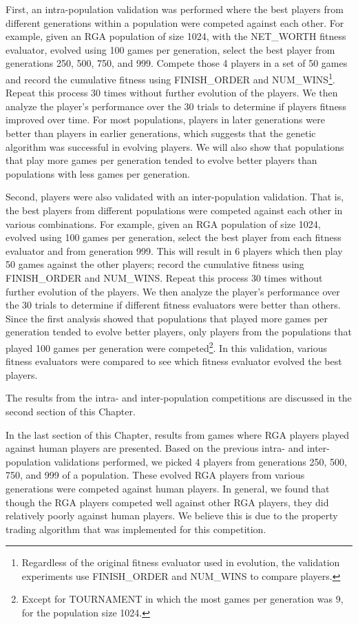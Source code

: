 First, an intra-population validation was performed where the best players from
different generations within a population were competed against each other.
For example, given an RGA population of size 1024, with the NET\_WORTH fitness
evaluator, evolved using 100 games per generation, select the best player from
generations 250, 500, 750, and 999. Compete those 4 players in a set of 50 games
and record the cumulative fitness using FINISH\_ORDER and
NUM\_WINS\footnote{Regardless of the original fitness evaluator used in
evolution, the validation experiments use FINISH\_ORDER and NUM\_WINS to
compare players.}. Repeat this process 30 times without further evolution of the
players. We then analyze the player's performance over the 30 trials to
determine if players fitness improved over time. For most populations, players
in later generations were better than players in earlier generations, which
suggests that the genetic algorithm was successful in evolving players. We will
also show that populations that play more games per generation tended to evolve
better players than populations with less games per generation. 

Second, players were also validated with an inter-population validation. That
is, the best players from different populations were competed against each other
in various combinations. For example, given an RGA population of size 1024,
evolved using 100 games per generation, select the best player from each fitness
evaluator and from generation 999. This will result in 6 players which then play
50 games against the other players;  record the cumulative fitness using
FINISH\_ORDER and NUM\_WINS. Repeat this process 30 times without further
evolution of the players. We then analyze the player's performance over the 30
trials to determine if different fitness evaluators were better than others.
Since the first analysis showed that populations that played more games per
generation tended to evolve better players, only players from the populations
that played 100 games per generation were competed\footnote{Except for
TOURNAMENT in which the most games per generation was 9, for the population size
1024.}. In this validation, various fitness evaluators were compared to see
which fitness evaluator evolved the best players.

The results from the intra- and inter-population competitions are discussed in
the second section of this Chapter.

In the last section of this Chapter, results from games where RGA players played
against human players are presented. Based on the previous intra- and
inter-population validations performed, we picked 4 players from generations
250, 500, 750, and 999 of a population. These evolved RGA players from
various generations were competed against human players. In general, we found
that though the RGA players competed well against other RGA players, they did
relatively poorly against human players. We believe this is due to the property
trading algorithm that was implemented for this competition.

